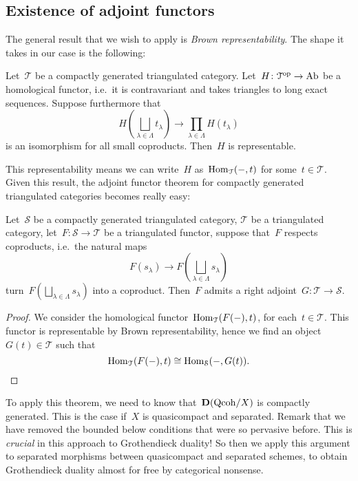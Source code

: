 \documentclass[10pt,a4paper]{article}
\begin{document}
\subsection{Existence of adjoint functors}
The general result that we wish to apply is \emph{Brown representability}. The shape it takes in our case is the following:
\begin{theorem}
  \label{theorem:brown-representability}
  Let~$\mathcal{T}$ be a compactly generated triangulated category. Let~$H\colon\mathcal{T}^{\mathrm{op}}\to\mathrm{Ab}$ be a homological functor, i.e.\ it is contravariant and takes triangles to long exact sequences. Suppose furthermore that
  \begin{equation}
    H\left( \bigsqcup_{\lambda\in\Lambda}t_\lambda \right)\to\prod_{\lambda\in\Lambda}H(t_\lambda)
  \end{equation}
  is an isomorphism for all small coproducts. Then~$H$ is representable.
\end{theorem}
This representability means we can write~$H$ as~$\operatorname{Hom}_{\mathcal{T}}(-,t)$ for some~$t\in\mathcal{T}$. Given this result, the adjoint functor theorem for compactly generated triangulated categories becomes really easy:
\begin{theorem}
  Let~$\mathcal{S}$ be a compactly generated triangulated category, $\mathcal{T}$ be a triangulated category, let~$F\colon\mathcal{S}\to\mathcal{T}$ be a triangulated functor, suppose that~$F$ respects coproducts, i.e.\ the natural maps
  \begin{equation}
    F(s_\lambda)\to F\left( \bigsqcup_{\lambda\in\Lambda}s_\lambda \right)
  \end{equation}
  turn~$F(\bigsqcup_{\lambda\in\Lambda}s_\lambda)$ into a coproduct. Then~$F$ admits a right adjoint~$G\colon\mathcal{T}\to\mathcal{S}$.

  \begin{proof}
    We consider the homological functor~$\operatorname{Hom}_{\mathcal{T}}(F(-),t)$, for each~$t\in\mathcal{T}$. This functor is representable by Brown representability, hence we find an object~$G(t)\in\mathcal{T}$ such that
    \begin{equation}
      \operatorname{Hom}_{\mathcal{T}}(F(-),t)\cong\operatorname{Hom}_{\mathcal{S}}(-,G(t)).
    \end{equation}
  \end{proof}
\end{theorem}
To apply this theorem, we need to know that~$\mathbf{D}(\mathrm{Qcoh}/X)$ is compactly generated. This is the case if~$X$ is quasicompact and separated. Remark that we have removed the bounded below conditions that were so pervasive before. This is \emph{crucial} in this approach to Grothendieck duality! So then we apply this argument to separated morphisms between quasicompact and separated schemes, to obtain Grothendieck duality almost for free by categorical nonsense.
\end{document}
